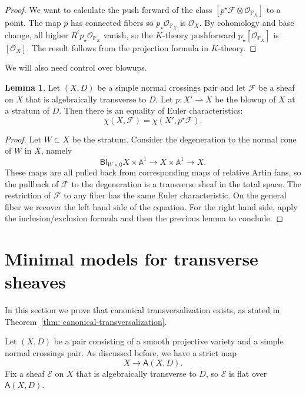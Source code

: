 \documentclass[11pt]{amsart}
\theoremstyle{definition}
\theoremstyle{definition}
\newtheorem{lemma}[theorem]{Lemma}
\begin{document}
\begin{proof}
We want to calculate the push forward of the class $[p^\star \mathcal F\otimes \mathcal O_{\mathbb P_X}]$ to a point. The map $p$ has connected fibers so $p_\star \mathcal O_{\mathbb P_X}$ is $\mathcal O_X$. By cohomology and base change, all higher $R^ip_\star\mathcal O_{\mathbb P_X}$ vanish, so the $K$-theory pushforward $p_\star [\mathcal O_{\mathbb P_X}]$ is $[\mathcal O_X]$. The result follows from the projection formula in $K$-theory. 
\end{proof}

We will also need control over blowups. 

\begin{lemma}\label{lem: blowup-formula}
Let $(X,D)$ be a simple normal crossings pair and let $\mathcal F$ be a sheaf on $X$ that is algebraically transverse to $D$. Let $p\colon X'\to X$ be the blowup of $X$ at a stratum of $D$. Then there is an equality of Euler characteristics:
\[
\chi(X,\mathcal F) = \chi(X',p^\star\mathcal F). 
\]
\end{lemma}

\begin{proof}
Let $W\subset X$ be the stratum. Consider the degeneration to the normal cone of $W$ in $X$, namely
\[
\mathsf{Bl}_{W\times 0} X\times\mathbb A^1\to X\times\mathbb A^1\to X.
\]
These maps are all pulled back from corresponding maps of relative Artin fans, so the pullback of $\mathcal F$ to the degeneration is a transverse sheaf in the total space. The restriction of $\mathcal F$ to any fiber has the same Euler characteristic. On the general fiber we recover the left hand side of the equation. For the right hand side, apply the inclusion/exclusion formula and then the previous lemma to conclude. 
\end{proof}

\section{Minimal models for transverse sheaves}\label{sec: transverse-collapse}

In this section we prove that canonical transversalization exists, as stated in Theorem~\ref{thm: canonical-transversalization}. 

Let $(X,D)$ be a pair consisting of a smooth projective variety and a simple normal crossings pair. As discussed before, we have a strict map
\[
X\to\mathsf A({X,D}).
\]
Fix a sheaf $\mathcal E$ on $X$ that is algebraically transverse to $D$, so $\mathcal E$ is flat over $\mathsf A(X,D)$. 
\end{document}

